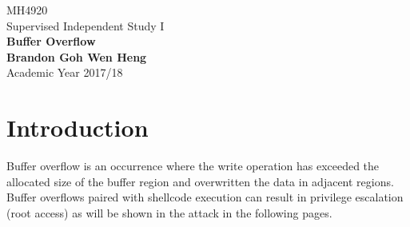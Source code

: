 \documentclass[a4paper,12pt]{article}
\begin{document}
	\begin{titlepage}
		\begin{center}
			\vspace*{9em}
			\Huge 
			MH4920\\ Supervised Independent Study I\\
			\vspace*{4em}
			\LARGE
			\textbf{Buffer Overflow\\}		
			\vspace{4em}
			\textbf{Brandon Goh Wen Heng}\\
			\vspace*{4em}
			Academic Year 2017/18
			\vfill
		\end{center}
	\end{titlepage}
	
	\tableofcontents
	\newpage
	\section{Introduction}
	Buffer overflow is an occurrence where the write operation has exceeded the allocated size of the buffer region and overwritten the data in adjacent regions. Buffer overflows paired with shellcode execution can result in privilege escalation (root access) as will be shown in the attack in the following pages.
\end{document}
